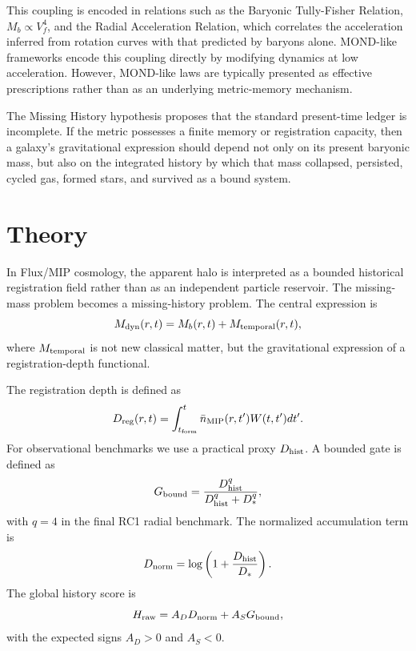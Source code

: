 \documentclass[11pt]{article}
\begin{document}
This coupling is encoded in relations such as the Baryonic Tully-Fisher Relation, $M_b \propto V_f^4$, and the Radial Acceleration Relation, which correlates the acceleration inferred from rotation curves with that predicted by baryons alone. MOND-like frameworks encode this coupling directly by modifying dynamics at low acceleration. However, MOND-like laws are typically presented as effective prescriptions rather than as an underlying metric-memory mechanism.

The Missing History hypothesis proposes that the standard present-time ledger is incomplete. If the metric possesses a finite memory or registration capacity, then a galaxy's gravitational expression should depend not only on its present baryonic mass, but also on the integrated history by which that mass collapsed, persisted, cycled gas, formed stars, and survived as a bound system.

\section{Theory}
In Flux/MIP cosmology, the apparent halo is interpreted as a bounded historical registration field rather than as an independent particle reservoir. The missing-mass problem becomes a missing-history problem. The central expression is
\begin{equation}
M_{\rm dyn}(r,t)=M_b(r,t)+M_{\rm temporal}(r,t),
\end{equation}
where $M_{\rm temporal}$ is not new classical matter, but the gravitational expression of a registration-depth functional.

The registration depth is defined as
\begin{equation}
D_{\rm reg}(r,t)=\int_{t_{\rm form}}^t \bar n_{\rm MIP}(r,t')W(t,t')dt'.
\end{equation}
For observational benchmarks we use a practical proxy $D_{\rm hist}$. A bounded gate is defined as
\begin{equation}
G_{\rm bound}=\frac{D_{\rm hist}^q}{D_{\rm hist}^q+D_*^q},
\end{equation}
with $q=4$ in the final RC1 radial benchmark. The normalized accumulation term is
\begin{equation}
D_{\rm norm}=\log\left(1+\frac{D_{\rm hist}}{D_*}\right).
\end{equation}
The global history score is
\begin{equation}
H_{\rm raw}=A_DD_{\rm norm}+A_SG_{\rm bound},
\end{equation}
with the expected signs $A_D>0$ and $A_S<0$.
\end{document}
